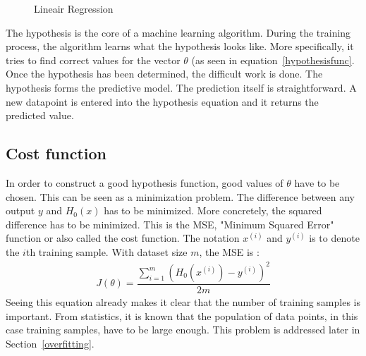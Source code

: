 \begin{figure}[H]
\centering
{}
\caption{Lineair Regression} \label{fig:regression}
\end{figure}
\noindent The hypothesis is the core of a machine learning algorithm. During the training process, the algorithm learns what the hypothesis looks like. More specifically, it tries to find correct values for the vector $\theta$ (as seen in equation~\ref{hypothesisfunc}. Once the hypothesis has been determined, the difficult work is done. The hypothesis forms the predictive model. The prediction itself is straightforward. A new datapoint is entered into the hypothesis equation and it returns the predicted value.

\subsection{Cost function}
\label{costfunction}
In order to construct a good hypothesis function, good values of $\theta$ have to be chosen. This can be seen as a minimization problem. The difference between any output $y$ and $H_0(x)$ has to be minimized. More concretely, the squared difference has to be minimized. This is the MSE, "Minimum Squared Error" function or also called the cost function. The notation $x^{(i)}$ and $y^{(i)}$ is to denote the $i$th training sample. With dataset size $m$, the MSE is \cite{stanford}:
\begin{align}
J(\theta) = \dfrac{\sum\limits_{i=1}^m(H_0(x^{(i)}) - y^{(i)})^2}{2m} 
\end{align}
\noindent Seeing this equation already makes it clear that the number of training samples is important. From statistics, it is known that the population of data points, in this case training samples, have to be large enough. This problem is addressed later in Section~\ref{overfitting}.

